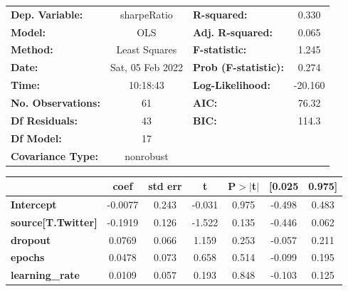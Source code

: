\begin{center}
\begin{tabular}{lclc}
\toprule
\textbf{Dep. Variable:}                   &   sharpeRatio    & \textbf{  R-squared:         } &     0.330   \\
\textbf{Model:}                           &       OLS        & \textbf{  Adj. R-squared:    } &     0.065   \\
\textbf{Method:}                          &  Least Squares   & \textbf{  F-statistic:       } &     1.245   \\
\textbf{Date:}                            & Sat, 05 Feb 2022 & \textbf{  Prob (F-statistic):} &    0.274    \\
\textbf{Time:}                            &     10:18:43     & \textbf{  Log-Likelihood:    } &   -20.160   \\
\textbf{No. Observations:}                &          61      & \textbf{  AIC:               } &     76.32   \\
\textbf{Df Residuals:}                    &          43      & \textbf{  BIC:               } &     114.3   \\
\textbf{Df Model:}                        &          17      & \textbf{                     } &             \\
\textbf{Covariance Type:}                 &    nonrobust     & \textbf{                     } &             \\
\bottomrule
\end{tabular}
\begin{tabular}{lcccccc}
                                          & \textbf{coef} & \textbf{std err} & \textbf{t} & \textbf{P$> |$t$|$} & \textbf{[0.025} & \textbf{0.975]}  \\
\midrule
\textbf{Intercept}                        &      -0.0077  &        0.243     &    -0.031  &         0.975        &       -0.498    &        0.483     \\
\textbf{source[T.Twitter]}                &      -0.1919  &        0.126     &    -1.522  &         0.135        &       -0.446    &        0.062     \\
\textbf{dropout}                          &       0.0769  &        0.066     &     1.159  &         0.253        &       -0.057    &        0.211     \\
\textbf{epochs}                           &       0.0478  &        0.073     &     0.658  &         0.514        &       -0.099    &        0.195     \\
\textbf{learning\_rate}                   &       0.0109  &        0.057     &     0.193  &         0.848        &       -0.103    &        0.125     \\

\end{tabular}
\end{center}
